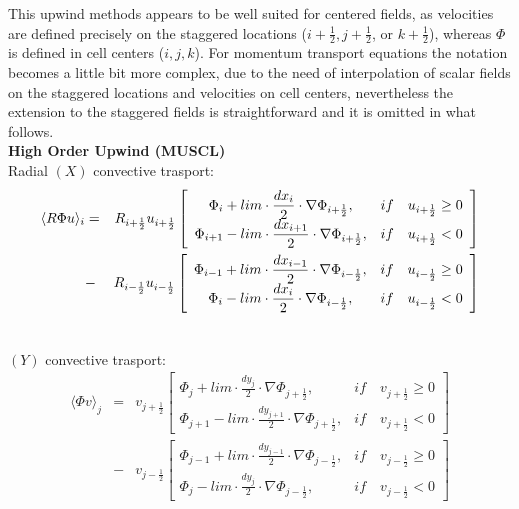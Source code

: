 This upwind methods appears to be well suited for centered fields,
as velocities are defined precisely on the staggered locations
 ($i+\frac{1}{2}, j+\frac{1}{2}$, or $k+\frac{1}{2}$),
whereas $\Phi$ is defined in cell centers ($i,j,k$).
For momentum transport equations the notation becomes a little bit 
more complex, due to the need of interpolation of scalar fields on the 
staggered locations and velocities on cell centers, nevertheless the extension 
to the staggered fields is straightforward and it is omitted in what follows.\\

{\bf High Order Upwind (MUSCL)}\\

Radial $(X)$ convective trasport:
\begin{eqnarray}
\htmlimage{}
%
\langle R \Phi u \rangle_{i} & = & R_{i+\frac{1}{2}} u_{i+\frac{1}{2}} 
\left[ \begin{array}{cc}
\displaystyle{\Phi_{i}+lim \cdot\frac{dx_i}{2} \cdot \nabla\Phi_{i+\frac{1}{2}}}, & \textstyle{if} \quad u_{i+\frac{1}{2}}  \ge 0 \\
\displaystyle{\Phi_{i+1}-lim \cdot\frac{dx_{i+1}}{2} \cdot \nabla\Phi_{i+\frac{1}{2}}}, & \textstyle{if} \quad u_{i+\frac{1}{2}} < 0
\end{array} \right] \\ \nonumber
%
                                 & - & R_{i-\frac{1}{2}} u_{i-\frac{1}{2}}
\left[ \begin{array}{cc}
\displaystyle{\Phi_{i-1}+lim \cdot\frac{dx_{i-1}}{2} \cdot \nabla\Phi_{i-\frac{1}{2}}}, & \textstyle{if} \quad u_{i-\frac{1}{2}}  \ge 0 \\
\displaystyle{\Phi_{i}-lim \cdot\frac{dx_i}{2} \cdot \nabla\Phi_{i-\frac{1}{2}}}, & \textstyle{if} \quad u_{i-\frac{1}{2}} < 0
\end{array} \right] \\ \nonumber
\end{eqnarray}
%

$(Y)$ convective trasport:
\begin{eqnarray}
\langle \Phi v \rangle_{j} & = & v_{j+\frac{1}{2}}
\left[ \begin{array}{cc}
\displaystyle{\Phi_{j} +lim \cdot\frac{dy_j}{2} \cdot \nabla\Phi_{j+\frac{1}{2}}}, & \textstyle{if} \quad v_{j+\frac{1}{2}}  \ge 0 \\
\displaystyle{\Phi_{j+1} -lim \cdot\frac{dy_{j+1}}{2} \cdot \nabla\Phi_{j+\frac{1}{2}}}, & \textstyle{if} \quad v_{j+\frac{1}{2}} < 0
\end{array} \right] \\ \nonumber
%
                               & - & v_{j-\frac{1}{2}}
\left[ \begin{array}{cc}
\displaystyle{\Phi_{j-1} +lim \cdot\frac{dy_{j-1}}{2} \cdot \nabla\Phi_{j-\frac{1}{2}}}, & \textstyle{if} \quad v_{j-\frac{1}{2}}  \ge 0 \\
\displaystyle{\Phi_{j} -lim \cdot\frac{dy_j}{2} \cdot \nabla\Phi_{j-\frac{1}{2}}}, & \textstyle{if} \quad v_{j-\frac{1}{2}} < 0
\end{array} \right] \nonumber
%
\end{eqnarray}

